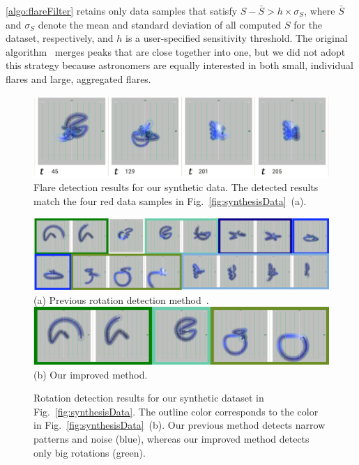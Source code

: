 \ref{algo:flareFilter} retains only data samples that satisfy $S - \bar{S} > h \times \sigma_{S}$, 
where $\bar{S}$ and $\sigma_{S}$ denote the mean and standard deviation of all computed $S$ for the dataset, respectively, 
and $h$ is a user-specified sensitivity threshold. 
The original algorithm~\cite{Palshikar2009} merges peaks that are close together into one, 
but we did not adopt this strategy
because astronomers are equally interested in both small, individual flares and large, aggregated flares.

\begin{figure}[tb]
    \centering
    \includegraphics[width=.85\linewidth]{vgtc_journal_latex/figures/flareDetectiondemodataResults.png}
    \caption{Flare detection results for our synthetic data. The detected results match the four red data samples in Fig.~\ref{fig:synthesisData}~(a).}
    \label{fig:flareDetection}
\end{figure}
\begin{figure}[tb]
    \centering
    \includegraphics[width=\linewidth]{vgtc_journal_latex/figures/rotationDetectiondemodataResultsOR.png}\\
    \footnotesize{\sf(a) Previous rotation detection method~\cite{Fujishiro2018}.}\\
    \includegraphics[width=.8\linewidth]{vgtc_journal_latex/figures/rotationDetectiondemodataResults.png}\\
    \footnotesize{\sf(b) Our improved method.}
    \caption{Rotation detection results for our synthetic dataset in Fig.~\ref{fig:synthesisData}. 
        The outline color corresponds to the color in Fig.~\ref{fig:synthesisData}~(b).
        Our previous method detects narrow patterns and noise (blue), 
        whereas our improved method detects only big rotations (green).}
    \label{fig:rotationResults}
\end{figure}
